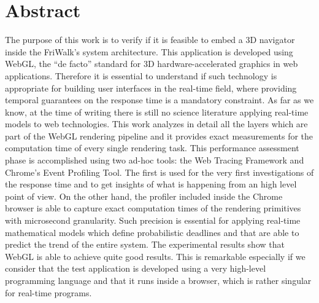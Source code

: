 \chapter*{Abstract} \label{abstract} %

The purpose of this work is to verify if it is feasible to embed a 3D navigator
inside the FriWalk's system architecture. This application is developed using
WebGL, the ``de facto'' standard for 3D hardware-accelerated graphics in
web applications. Therefore it is essential to understand if such technology
is appropriate for building user interfaces in the real-time field, where
providing temporal guarantees on the response time is a mandatory constraint.
As far as we know, at the time of writing there is still no science literature
applying real-time models to web technologies.
%
This work analyzes in detail all the layers which are part of the WebGL
rendering pipeline and it provides exact measurements for the computation time
of every single rendering task.
This performance assessment phase is accomplished using two ad-hoc tools: the
Web Tracing Framework and Chrome's Event Profiling Tool.
The first is used for the very first investigations of the response time and to
get insights of what is happening from an high level point of view.
On the other hand, the profiler included inside the Chrome browser is able to
capture exact computation times of the rendering primitives with microsecond
granularity.
%
Such precision is essential for applying real-time mathematical models which
define probabilistic deadlines and that are able to predict the trend of the
entire system.
%
The experimental results show that WebGL is able to achieve quite good results.
This is remarkable especially if we consider that the test application is
developed using a very high-level programming language and that it runs inside
a browser, which is rather singular for real-time programs. 
